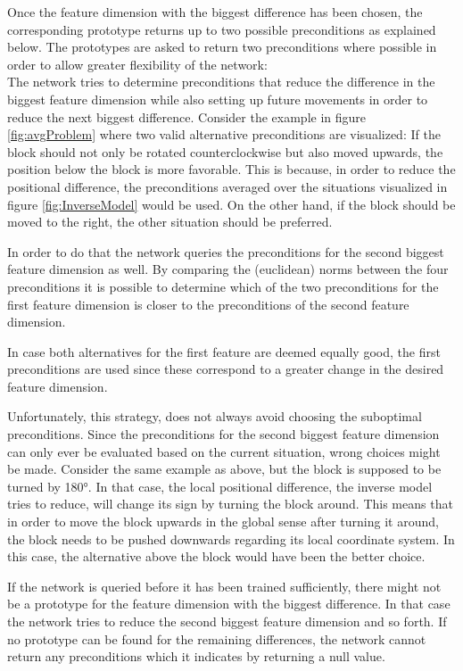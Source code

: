 Once the feature dimension with the biggest difference has been chosen, the corresponding prototype returns up to two possible preconditions as explained below.
The prototypes are asked to return two preconditions where possible in order to allow greater flexibility of the network: \\
The network tries to determine preconditions that reduce the difference in the biggest feature dimension while also setting up future movements in order to reduce the next biggest difference. Consider the example in figure \ref{fig:avgProblem} where two valid alternative preconditions are visualized: If the block should not only be rotated counterclockwise but also moved upwards, the position below the block is more favorable. This is because, in order to reduce the positional difference, the preconditions averaged over the situations visualized in figure \ref{fig:InverseModel} would be used. On the other hand, if the block should be moved to the right, the other situation should be preferred.

In order to do that the network queries the preconditions for the second biggest feature dimension as well. By comparing the (euclidean) norms between the four preconditions it is possible to determine which of the two preconditions for the first feature dimension is closer to the preconditions of the second feature dimension.  

In case both alternatives for the first feature are deemed equally good, the first preconditions are used since these correspond to a greater change in the desired feature dimension.

Unfortunately, this strategy, does not always avoid choosing the suboptimal preconditions. Since the preconditions for the second biggest feature dimension can only ever be evaluated based on the current situation, wrong choices might be made. Consider the same example as above, but the block is supposed to be turned by 180°. In that case, the local positional difference, the inverse model tries to reduce, will change its sign by turning the block around. This means that in order to move the block upwards in the global sense after turning it around, the block needs to be pushed downwards regarding its local coordinate system. In this case, the alternative above the block would have been the better choice.

If the network is queried before it has been trained sufficiently, there might not be a prototype for the feature dimension with the biggest difference. In that case the network tries to reduce the second biggest feature dimension and so forth. If no prototype can be found for the remaining differences, the network cannot return any preconditions which it indicates by returning a null value. 

